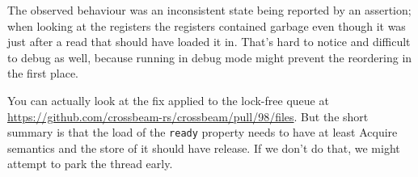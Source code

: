 The observed behaviour was an inconsistent state being reported by an assertion; when looking at the registers the registers contained garbage even though it was just after a read that should have loaded it in. That's hard to notice and difficult to debug as well, because running in debug mode might prevent the reordering in the first place.

You can actually look at the fix applied to the lock-free queue at \url{https://github.com/crossbeam-rs/crossbeam/pull/98/files}. But the short summary is that the load of the \texttt{ready} property needs to have at least Acquire semantics and the store of it should have release.  If we don't do that, we might attempt to park the thread early. 




